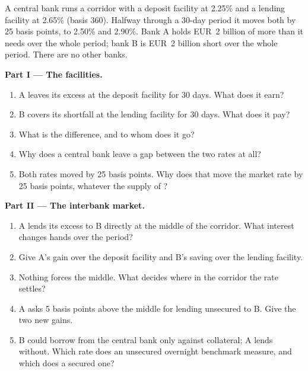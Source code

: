 \begin{problem}\label{pb:m2:central-banks-and-the-short-rate:1}
A central bank runs a corridor with a deposit facility at 2.25\% and a
lending facility at 2.65\% (basis 360). Halfway through a 30-day period it
moves both by 25 basis points, to 2.50\% and 2.90\%. Bank A holds EUR~2
billion of  more than it needs over the whole period; bank B is EUR~2
billion short over the whole period. There are no other banks.

\medskip\noindent\textbf{Part I --- The facilities.}
\begin{enumerate}
\item A leaves its excess at the deposit facility for 30 days. What does it
earn?
\item B covers its shortfall at the lending facility for 30 days. What does
it pay?
\item What is the difference, and to whom does it go?
\item Why does a central bank leave a gap between the two rates at all?
\item Both rates moved by 25 basis points. Why does that move the market
rate by 25 basis points, whatever the supply of ?
\end{enumerate}

\medskip\noindent\textbf{Part II --- The interbank market.}
\begin{enumerate}[resume]
\item A lends its excess to B directly at the middle of the corridor. What
interest changes hands over the period?
\item Give A's gain over the deposit facility and B's saving over the lending
facility.
\item Nothing forces the middle. What decides where in the corridor the rate
settles?
\item A asks 5 basis points above the middle for lending unsecured to B.
Give the two new gains.
\item B could borrow from the central bank only against collateral; A lends
without. Which rate does an unsecured overnight benchmark measure, and which
does a secured one?
\end{enumerate}


\end{problem}
